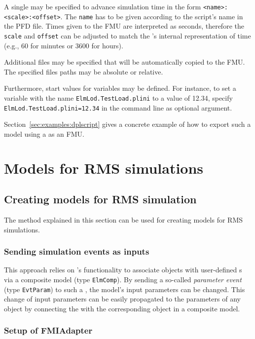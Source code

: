 A single \dplscript may be specified to advance simulation time in the form \texttt{<name>:<scale>:<offset>}.
The \texttt{name} has to be given according to the script's name in the PFD file.
Times given to the FMU are interpreted as seconds, therefore the \texttt{scale} and \texttt{offset} can be adjusted to match the \dplscript's internal representation of time (e.g., 60 for minutes or 3600 for hours).

Additional files may be specified that will be automatically copied to the FMU. The specified files paths may be absolute or relative.

Furthermore, start values for variables may be defined. For instance, to set a variable with the name \texttt{ElmLod.TestLoad.plini} to a value of 12.34, specify \texttt{ElmLod.TestLoad.plini=12.34} in the command line as optional argument.

Section~\ref{sec:examples:dplscript} gives a concrete example of how to export such a model using a \dplscript as an FMU.


\newpage


\section{Models for RMS simulations}

\subsection{Creating models for RMS simulation}
\label{sec:export:create_model_rms}

The method explained in this section can be used for creating models for RMS simulations.

\subsubsection*{Sending simulation events as inputs}

This approach relies on \pf's functionality to associate objects with user-defined {\dslmodel}s via a composite model (type \texttt{ElmComp}).
By sending a so-called \emph{parameter event} (type \texttt{EvtParam}) to such a \dslmodel, the model's input parameters can be changed.
This change of input parameters can be easily propagated to the parameters of any object by connecting the \dslmodel with the corresponding object in a composite model.

\subsubsection*{Setup of \dslmodel FMIAdapter}

